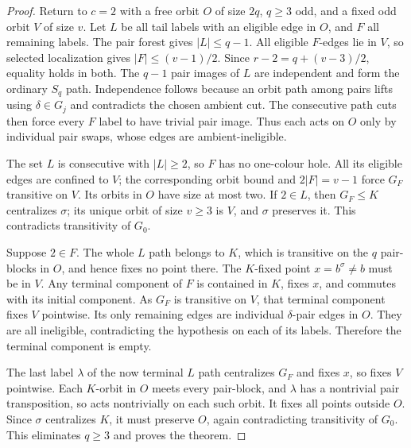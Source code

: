 \documentclass[11pt,a4paper]{article}
\begin{document}
\begin{proof}
Return to $c=2$ with a free orbit $O$ of size $2q$, $q\ge3$
odd, and a fixed odd orbit $V$ of size $v$. Let $L$ be all tail
labels with an eligible edge in $O$, and $F$ all remaining labels.
The pair forest gives $|L|\le q-1$. All eligible $F$-edges lie in
$V$, so selected localization gives $|F|\le(v-1)/2$.
Since $r-2=q+(v-3)/2$, equality holds in both.
The $q-1$ pair images of $L$ are independent and form the ordinary
$S_q$ path. Independence follows because an orbit path among pairs
lifts using $\delta\in G_j$ and contradicts the chosen ambient cut.
The consecutive path cuts then force every $F$ label to have trivial
pair image. Thus each acts on $O$ only by individual pair swaps,
whose edges are ambient-ineligible.

The set $L$ is consecutive with $|L|\ge2$, so $F$ has no
one-colour hole. All its eligible edges are confined to $V$;
the corresponding orbit bound and $2|F|=v-1$ force $G_F$
transitive on $V$. Its orbits in $O$ have size at most two.
If $2\in L$, then $G_F\le K$ centralizes $\sigma$; its unique
orbit of size $v\ge3$ is $V$, and $\sigma$ preserves it.
This contradicts transitivity of $G_0$.

Suppose $2\in F$. The whole $L$ path belongs to $K$, which is
transitive on the $q$ pair-blocks in $O$, and hence fixes no point
there. The $K$-fixed point $x=b^\sigma\ne b$ must be in $V$.
Any terminal component of $F$ is contained in $K$, fixes $x$,
and commutes with its initial component. As $G_F$ is transitive
on $V$, that terminal component fixes $V$ pointwise. Its only
remaining edges are individual $\delta$-pair edges in $O$.
They are all ineligible, contradicting the hypothesis on each
of its labels. Therefore the terminal component is empty.

The last label $\lambda$ of the now terminal $L$ path centralizes
$G_F$ and fixes $x$, so fixes $V$ pointwise. Each $K$-orbit in
$O$ meets every pair-block, and $\lambda$ has a nontrivial pair
transposition, so acts nontrivially on each such orbit. It fixes
all points outside $O$. Since $\sigma$ centralizes $K$, it must
preserve $O$, again contradicting transitivity of $G_0$.
This eliminates $q\ge3$ and proves the theorem.
\end{proof}
\end{document}
